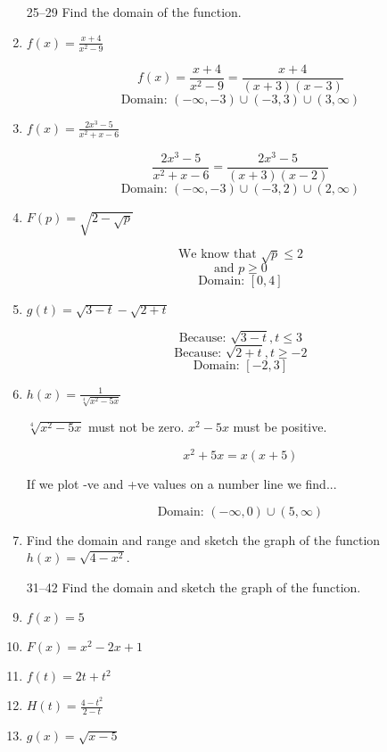 \documentclass{article}
\begin{document}
\begin{enumerate}
			\item[25--29] Find the domain of the function.

			\item $f(x) = \frac{x + 4}{x^2 - 9} $

				$$ f(x) = \frac{x + 4}{x^2 - 9} = \frac{x + 4}{(x + 3)(x - 3)} $$
				$$ \text{Domain: } (-\infty, -3) \cup (-3, 3) \cup (3, \infty) $$

			\item $f(x) = \frac{2x^3 - 5}{x^2 + x - 6}$
				
				$$ \frac{2x^3 - 5}{x^2 + x - 6} = \frac{2x^3 - 5}{(x + 3)(x - 2)} $$
				$$ \text{Domain: } (-\infty, -3) \cup (-3, 2) \cup (2, \infty) $$

		\item $F(p) = \sqrt{2 - \sqrt{p}}$

			$$\text{We know that } \sqrt{p} \leq  2$$
			$$\text{and } p \geq 0$$
			$$\text{Domain: } [0, 4]$$

		\item $g(t) = \sqrt{3 - t} - \sqrt{2 + t}$

			$$\text{Because: } \sqrt{3 - t}, t \leq 3$$
			$$\text{Because: } \sqrt{2 + t}, t \geq -2$$
			$$\text{Domain: } [-2, 3]$$

		\item $h(x) = \frac{1}{\sqrt[4]{x^2 - 5x}}$

			$\sqrt[4]{x^2 - 5x}$ must not be zero. $x^2 - 5x$ must be positive.

			$$x^2 + 5x = x(x + 5)$$

			If we plot -ve and +ve values on a number line we find...

			$$\text{Domain: } (-\infty, 0) \cup (5, \infty) $$

		\item Find the domain and range and sketch the graph of the function $h(x) = \sqrt{4 - x^2}$.
		
		\item[31--42] Find the domain and sketch the graph of the function.

		\item $f(x) = 5$

		\item $F(x) = x^2 - 2x + 1$

		\item $f(t) = 2t + t^2$

		\item $H(t) = \frac{4 - t^2}{2 - t}$

		\item $g(x) = \sqrt{x - 5}$


\end{enumerate}
\end{document}
